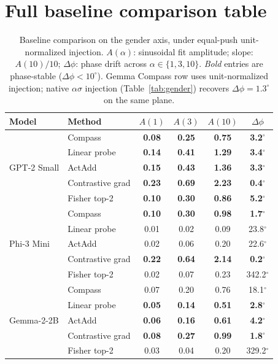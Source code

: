 \section{Full baseline comparison table}
\label{app:baselines}

\begin{table}[h]
\centering
\small
\caption{Baseline comparison on the gender axis, under equal-push
unit-normalized injection. $A(\alpha)$: sinusoidal fit amplitude; slope:
$A(10)/10$; $\Delta\phi$: phase drift across $\alpha\in\{1,3,10\}$.
\emph{Bold} entries are phase-stable ($\Delta\phi < 10^\circ$).
Gemma Compass row uses unit-normalized injection; native $\alpha\sigma$
injection (Table~\ref{tab:gender}) recovers $\Delta\phi=1.3^\circ$ on
the same plane.}
\label{tab:baselines}
\begin{tabular}{llcccc}
\toprule
Model & Method & $A(1)$ & $A(3)$ & $A(10)$ & $\Delta\phi$ \\
\midrule
\multirow{5}{*}{GPT-2 Small}
& Compass            & \textbf{0.08} & \textbf{0.25} & \textbf{0.75} & \textbf{3.2}$^\circ$ \\
& Linear probe       & \textbf{0.14} & \textbf{0.41} & \textbf{1.29} & \textbf{3.4}$^\circ$ \\
& ActAdd             & \textbf{0.15} & \textbf{0.43} & \textbf{1.36} & \textbf{3.3}$^\circ$ \\
& Contrastive grad   & \textbf{0.23} & \textbf{0.69} & \textbf{2.23} & \textbf{0.4}$^\circ$ \\
& Fisher top-2       & \textbf{0.10} & \textbf{0.30} & \textbf{0.86} & \textbf{5.2}$^\circ$ \\
\midrule
\multirow{5}{*}{Phi-3 Mini}
& Compass            & \textbf{0.10} & \textbf{0.30} & \textbf{0.98} & \textbf{1.7}$^\circ$ \\
& Linear probe       & 0.01 & 0.02 & 0.09 & 23.8$^\circ$ \\
& ActAdd             & 0.02 & 0.06 & 0.20 & 22.6$^\circ$ \\
& Contrastive grad   & \textbf{0.22} & \textbf{0.64} & \textbf{2.14} & \textbf{0.2}$^\circ$ \\
& Fisher top-2       & 0.02 & 0.07 & 0.23 & 342.2$^\circ$ \\
\midrule
\multirow{5}{*}{Gemma-2-2B}
& Compass            & 0.07 & 0.20 & 0.76 & 18.1$^\circ$ \\
& Linear probe       & \textbf{0.05} & \textbf{0.14} & \textbf{0.51} & \textbf{2.8}$^\circ$ \\
& ActAdd             & \textbf{0.06} & \textbf{0.16} & \textbf{0.61} & \textbf{4.2}$^\circ$ \\
& Contrastive grad   & \textbf{0.08} & \textbf{0.27} & \textbf{0.99} & \textbf{1.8}$^\circ$ \\
& Fisher top-2       & 0.03 & 0.04 & 0.20 & 329.2$^\circ$ \\
\bottomrule
\end{tabular}
\end{table}

